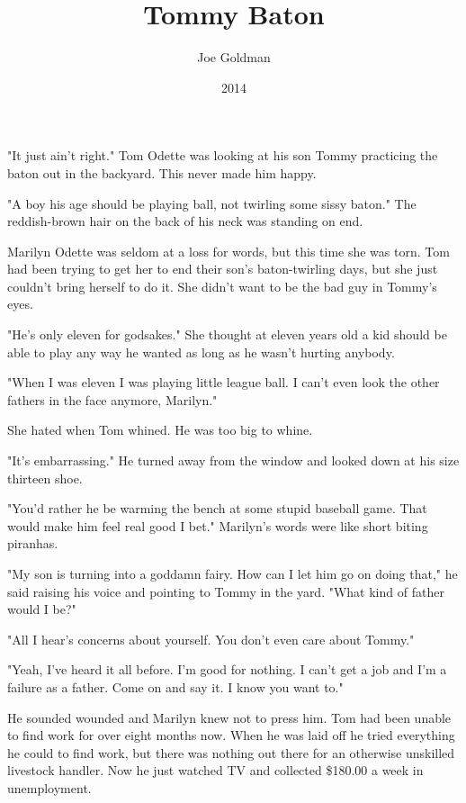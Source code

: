 \documentclass[10pt,a4paper]{article}
\begin{document}
\title{Tommy Baton}
\date{2014}
\author{Joe Goldman}
\maketitle
    
\thispagestyle{plain}
\setcounter{page}{1}
\linenumbers
\noindent"It just ain't right." Tom Odette was looking at his son Tommy practicing the baton out in the backyard. This never made him happy.


"A boy his age should be playing ball, not twirling some sissy baton." The reddish-brown hair on the back of his neck was standing on end.

Marilyn Odette was seldom at a loss for words, but this time she was torn. Tom had been trying to get her to end their son's baton-twirling days, but she just couldn't bring herself to do it. She didn't want to be the bad guy in Tommy's eyes.

"He's only eleven for godsakes." She thought at eleven years old a kid should be able to play any way he wanted as long as he wasn't hurting anybody.

"When I was eleven I was playing little league ball. I can't even look the other fathers in the face anymore, Marilyn."

She hated when Tom whined. He was too big to whine.

"It's embarrassing." He turned away from the window and looked down at his size thirteen shoe.

"You'd rather he be warming the bench at some stupid baseball game. That would make him feel real good I bet." Marilyn's words were like short biting piranhas.

"My son is turning into a goddamn fairy. How can I let him go on doing that," he said raising his voice and pointing to Tommy in the yard. "What kind of father would I be?"

"All I hear's concerns about yourself. You don't even care about Tommy."

"Yeah, I've heard it all before. I'm good for nothing. I can't get a job and I'm a failure as a father. Come on and say it. I know you want to."

He sounded wounded and Marilyn knew not to press him. Tom had been unable to find work for over eight months now. When he was laid off he tried everything he could to find work, but there was nothing out there for an otherwise unskilled livestock handler. Now he just watched TV and collected \$180.00 a week in unemployment.
\end{document}

